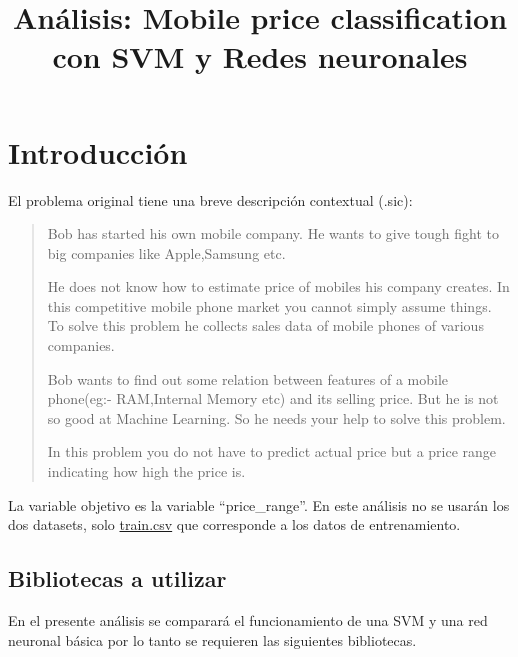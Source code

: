 \documentclass[12pt,a4paper,table]{article}
\title{Análisis: Mobile price classification con SVM y Redes neuronales}
\makeatletter
\let\newtitle\@title
\makeatother
\begin{document}
    
    
    

    
\hypertarget{actividad-clasificaciuxf3n-con-muxe1quina-de-vectores-de-soporte-y-redes-de-neuronas-mobile-price-classification}{%
\textcolor{UnirDark}{\Large\bfseries\newtitle}\label{actividad-clasificaciuxf3n-con-muxe1quina-de-vectores-de-soporte-y-redes-de-neuronas-mobile-price-classification}}

\hypertarget{introducciuxf3n}{%
\section{Introducción}\label{introducciuxf3n}}

El problema original tiene una breve descripción contextual (.sic):

\begin{quote}
Bob has started his own mobile company. He wants to give tough fight to
big companies like Apple,Samsung etc.

He does not know how to estimate price of mobiles his company creates.
In this competitive mobile phone market you cannot simply assume things.
To solve this problem he collects sales data of mobile phones of various
companies.

Bob wants to find out some relation between features of a mobile
phone(eg:- RAM,Internal Memory etc) and its selling price. But he is not
so good at Machine Learning. So he needs your help to solve this
problem.

In this problem you do not have to predict actual price but a price
range indicating how high the price is. \citep{Sharma2018}
\end{quote}

La variable objetivo es la variable ``price\_range''. En este análisis
no se usarán los dos datasets, solo
\href{https://www.kaggle.com/iabhishekofficial/mobile-price-classification\#train.csv}{train.csv}
que corresponde a los datos de entrenamiento.

\hypertarget{bibliotecas-a-utilizar}{%
\subsection{Bibliotecas a utilizar}\label{bibliotecas-a-utilizar}}

En el presente análisis se comparará el funcionamiento de una SVM y una
red neuronal básica por lo tanto se requieren las siguientes
bibliotecas.
\end{document}
